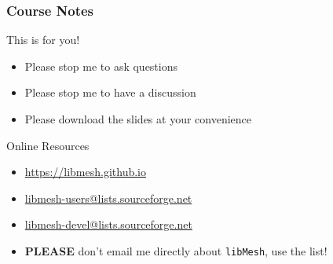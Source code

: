 \begin{frame}
\frametitle{Course Notes}

\begin{block}{This is for you!}
\begin{itemize}
\item Please stop me to ask questions
\item Please stop me to have a discussion
\item Please download the slides at your convenience
\end{itemize}
\end{block}

\begin{block}{Online Resources}
\begin{itemize}
\item \url{https://libmesh.github.io}
\item \href{mailto:libmesh-users@lists.sourceforge.net}{libmesh-users@lists.sourceforge.net}
\item \href{mailto:libmesh-devel@lists.sourceforge.net}{libmesh-devel@lists.sourceforge.net}
\item \textbf{PLEASE} don't email me directly about \texttt{libMesh}, use the list!
\end{itemize}
\end{block}

\end{frame}
